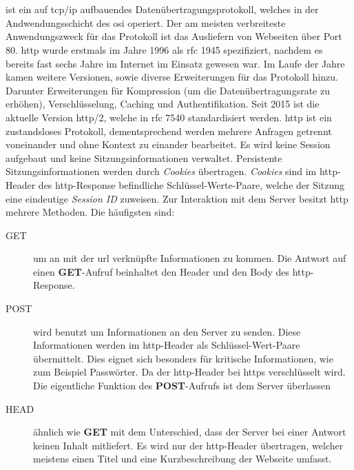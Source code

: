 \documentclass[titlepage]{report}
\begin{document}
\section{}
 ist ein auf \gls{tcp}/\gls{ip} aufbauendes
Datenübertragungsprotokoll, welches in der Andwendungsschicht des
\gls{osi} operiert. Der am meisten verbreiteste Anwendungszweck für das
Protokoll ist das Ausliefern von Webseiten über Port 80. \gls{http}
wurde erstmals im Jahre 1996 als \gls{rfc} 1945 spezifiziert, nachdem 
es bereits fast sechs Jahre im Internet im Einsatz gewesen
war\cite{RFC1945}. Im Laufe der Jahre kamen weitere Versionen,
sowie diverse Erweiterungen für das Protokoll hinzu. Darunter
Erweiterungen für Kompression (um die Datenübertragungsrate zu erhöhen),
Verschlüsselung, Caching und Authentifikation. Seit 2015 ist die
aktuelle Version \gls{http}/2, welche in \gls{rfc} 7540 standardisiert
werden\cite{RFC7540}. \gls{http} ist ein zustandsloses Protokoll,
dementsprechend werden mehrere Anfragen getrennt voneinander und ohne
Kontext zu einander bearbeitet. Es wird keine Session aufgebaut und
keine Sitzungsinformationen verwaltet. Persistente Sitzungsinformationen 
werden durch \emph{Cookies} übertragen. \emph{Cookies} sind im
\gls{http}\hyp{}Header des \gls{http}\hyp{}Response befindliche
Schlüssel\hyp{}Werte\hyp{}Paare,
welche der Sitzung eine eindeutige \emph{Session ID}
zuweisen\cite{RFC2965}\cite{RFC6265}\cite{RFC2109}.
Zur Interaktion mit dem Server besitzt \gls{http} mehrere Methoden. Die häufigsten sind:
\begin{description}
    \item[GET] um an mit der \gls{url} verknüpfte Informationen zu
        kommen. Die Antwort auf einen \textbf{GET}\hyp{}Aufruf
        beinhaltet den Header und den Body des
        \gls{http}\hyp{}Response\cite[Siehe Section 9.3]{RFC2616}.
    \item[POST] wird benutzt um Informationen an den Server zu senden.
        Diese Informationen werden im \gls{http}\hyp{}Header als
        Schlüssel\hyp{}Wert\hyp{}Paare übermittelt\cite[Siehe Section
        9.5]{RFC2616}. Dies eignet sich besonders für kritische Informationen, wie zum Beispiel
        Passwörter. Da der \gls{http}\hyp{}Header bei \gls{https}
        verschlüsselt wird. Die eigentliche Funktion des
        \textbf{POST}\hyp{}Aufrufs ist dem Server überlassen\cite[Siehe
        Section 9.3]{RFC2616}
    \item[HEAD] ähnlich wie \textbf{GET} mit dem Unterschied, dass
        der Server bei einer Antwort keinen Inhalt mitliefert. Es wird
        nur der \gls{http}\hyp{}Header übertragen\cite[Siehe Section
        9.4]{RFC2616}, welcher meistens
        einen Titel und eine Kurzbeschreibung der Webseite umfasst.
\end{description}
\end{document}
